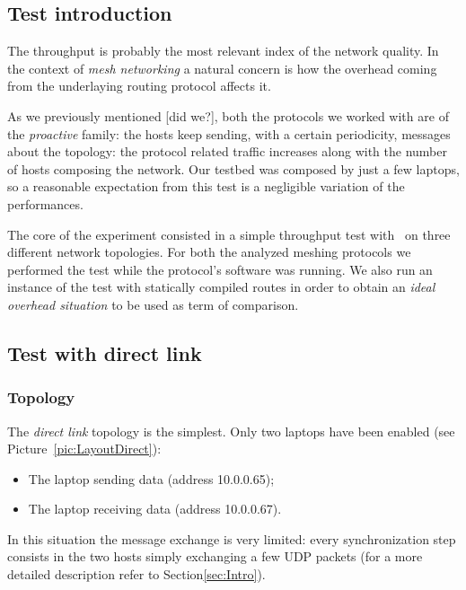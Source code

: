 \subsection{Test introduction}

    The throughput is probably the most relevant index of the network
    quality. In the context of \emph{mesh networking} a natural concern
    is how the overhead coming from the underlaying routing protocol
    affects it.

    As we previously mentioned [did we?], both the protocols we worked
    with are of the \emph{proactive} family: the hosts keep sending,
    with a certain periodicity, messages about the topology: the protocol
    related traffic increases along with the number of hosts composing the
    network.  Our testbed was composed by just a few laptops, so a
    reasonable expectation from this test is a negligible variation of the
    performances.

    The core of the experiment consisted in a simple throughput test with
    \netperf\ on three different network topologies. For both the
    analyzed meshing protocols we performed the test while the protocol's
    software was running. We also run an instance of the test with
    statically compiled routes in order to obtain an \emph{ideal overhead
    situation} to be used as term of comparison.

\subsection{Test with direct link}

    \subsubsection{Topology}

        The \emph{direct link} topology is the simplest. Only two laptops
        have been enabled (see Picture~\ref{pic:LayoutDirect}):
        \begin{itemize}
        \item   The laptop sending data (address 10.0.0.65);
        \item   The laptop receiving data (address 10.0.0.67).
        \end{itemize}

        In this situation the message exchange is very limited: every
        synchronization step consists in the two hosts simply exchanging a
        few UDP packets (for a more detailed description refer to
        Section\ref{sec:Intro}).

